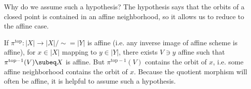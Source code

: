 %
Why do we assume such a hypothesis? The hypothesis says that the orbits of a closed point is contained in an affine neighborhood, so it allows us to reduce to the affine case. 

If $\pi^{\text{top}}:|X|\to |X|/\sim=|Y|$ is affine (i.e. any inverse image of affine scheme is affine), %
for $x\in |X|$ mapping to $y\in |Y|$, there exists $V\ni y$ affine such that $\pi^{\text{top}-1}(V)\subeq X$ is affine. But $\pi^{\text{top}-1}(V)$ contains the orbit of $x$, i.e. some affine neighborhood contains the orbit of $x$. Because the quotient morphism will often be affine, it is helpful to assume such a hypothesis.
%
%
%
%
